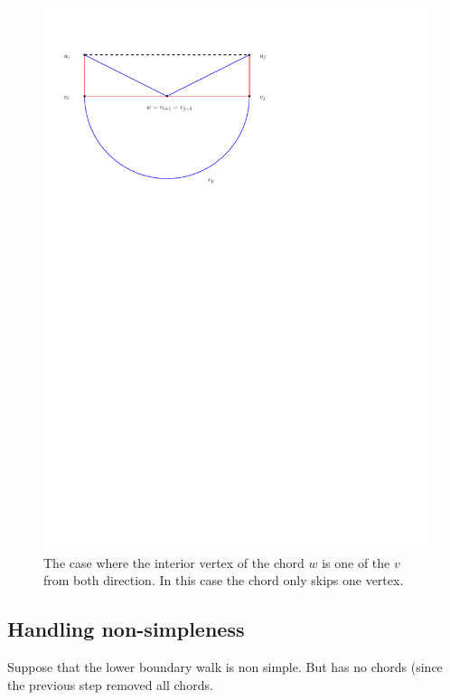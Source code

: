 \documentclass[a4paper]{article}
\theoremstyle{definition}
\begin{document}
\begin{figure}
\includegraphics[scale=1]{img/shortChordColoring}
\caption{The case where the interior vertex of the chord $w$ is one of the $v$ from both direction. In this case the chord only skips one vertex.}
\end{figure}

\subsection{Handling non-simpleness}

Suppose that the lower boundary walk is non simple. But has no chords (since the previous step removed all chords.
\end{document}
